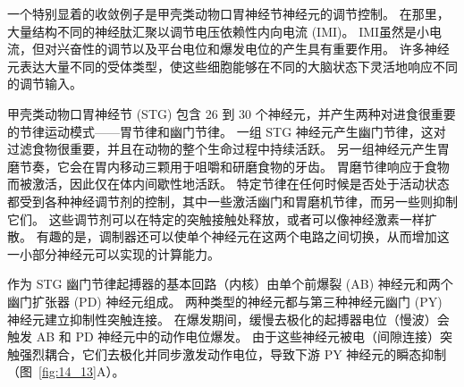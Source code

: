 一个特别显着的收敛例子是甲壳类动物口胃神经节神经元的调节控制。
在那里，大量结构不同的神经肽汇聚以调节电压依赖性内向电流 (IMI)。
IMI虽然是小电流，但对兴奋性的调节以及平台电位和爆发电位的产生具有重要作用。
许多神经元表达大量不同的受体类型，使这些细胞能够在不同的大脑状态下灵活地响应不同的调节输入。


甲壳类动物口胃神经节 (STG) 包含 26 到 30 个神经元，并产生两种对进食很重要的节律运动模式——胃节律和幽门节律。
一组 STG 神经元产生幽门节律，这对过滤食物很重要，并且在动物的整个生命过程中持续活跃。
另一组神经元产生胃磨节奏，它会在胃内移动三颗用于咀嚼和研磨食物的牙齿。
胃磨节律响应于食物而被激活，因此仅在体内间歇性地活跃。
特定节律在任何时候是否处于活动状态都受到各种神经调节剂的控制，其中一些激活幽门和胃磨机节律，而另一些则抑制它们。
这些调节剂可以在特定的突触接触处释放，或者可以像神经激素一样扩散。
有趣的是，调制器还可以使单个神经元在这两个电路之间切换，从而增加这一小部分神经元可以实现的计算能力。


作为 STG 幽门节律起搏器的基本回路（内核）由单个前爆裂 (AB) 神经元和两个幽门扩张器 (PD) 神经元组成。
两种类型的神经元都与第三种神经元幽门 (PY) 神经元建立抑制性突触连接。
在爆发期间，缓慢去极化的起搏器电位（慢波）会触发 AB 和 PD 神经元中的动作电位爆发。
由于这些神经元被电（间隙连接）突触强烈耦合，它们去极化并同步激发动作电位，导致下游 PY 神经元的瞬态抑制（图~\ref{fig:14_13}A）。


